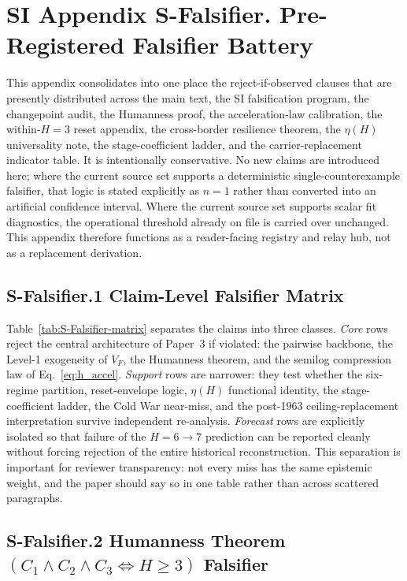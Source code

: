 \documentclass[11pt]{article}
\begin{document}
\section*{SI Appendix S-Falsifier. Pre-Registered Falsifier Battery}
\label{sec:S-Falsifier}

This appendix consolidates into one place the reject-if-observed clauses that
are presently distributed across the main text, the SI falsification program,
the changepoint audit, the Humanness proof, the acceleration-law calibration,
the within-$H{=}3$ reset appendix, the cross-border resilience theorem, the
$\eta(H)$ universality note, the stage-coefficient ladder, and the
carrier-replacement indicator table. It is intentionally conservative. No new
claims are introduced here; where the current source set supports a
deterministic single-counterexample falsifier, that logic is stated explicitly
as $n{=}1$ rather than converted into an artificial confidence interval.
Where the current source set supports scalar fit diagnostics, the operational
threshold already on file is carried over unchanged. This appendix therefore
functions as a reader-facing registry and relay hub, not as a replacement
derivation.

\subsection*{S-Falsifier.1 Claim-Level Falsifier Matrix}
\label{sec:S-Falsifier-matrix}

Table~\ref{tab:S-Falsifier-matrix} separates the claims into three classes.
\emph{Core} rows reject the central architecture of Paper~3 if violated: the
pairwise backbone, the Level-1 exogeneity of $V_F$, the Humanness theorem,
and the semilog compression law of Eq.~\eqref{eq:h_accel}. \emph{Support}
rows are narrower: they test whether the six-regime partition, reset-envelope
logic, $\eta(H)$ functional identity, the stage-coefficient ladder, the
Cold War near-miss, and the post-1963 ceiling-replacement interpretation
survive independent re-analysis. \emph{Forecast} rows are explicitly
isolated so that failure of the $H{=}6\to 7$ prediction can be reported
cleanly without forcing rejection of the entire historical reconstruction.
This separation is important for reviewer transparency: not every miss has
the same epistemic weight, and the paper should say so in one table rather
than across scattered paragraphs.

\subsection*{S-Falsifier.2 Humanness Theorem
  \texorpdfstring{$(C_1\wedge C_2\wedge C_3 \Leftrightarrow H\ge 3)$}%
                 {(C1 and C2 and C3 iff H>=3)} Falsifier}
\label{sec:S-Falsifier-hum}
\end{document}
